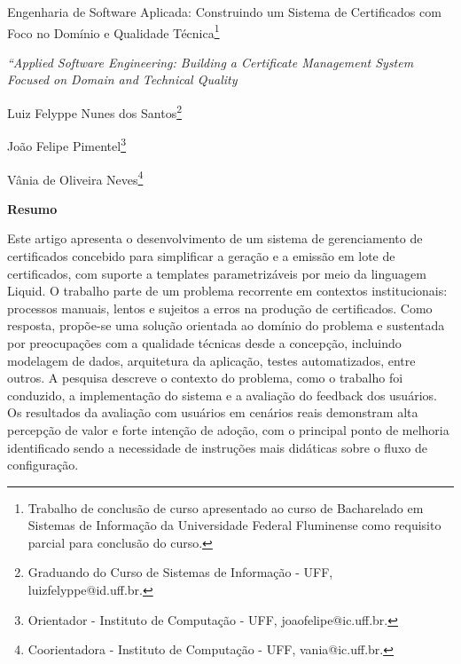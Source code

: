 \documentclass[article,a4paper,12pt,brazil,sumario=tradicional]{abntex2}
\begin{document}
\textual

\begin{center}
{\Large Engenharia de Software Aplicada: Construindo um Sistema de Certificados com Foco no Domínio e Qualidade Técnica\footnote{Trabalho de conclusão de curso apresentado ao curso de Bacharelado em Sistemas de Informação da Universidade Federal Fluminense como requisito parcial para conclusão do curso.}

\vspace{.2cm} 
\textit{“Applied Software Engineering: Building a Certificate Management System Focused on Domain and Technical Quality}\\}
\end{center}
\vspace{.2cm} 

\begin{flushright}
Luiz Felyppe Nunes dos Santos\footnote{Graduando do Curso de Sistemas de Informação - UFF, luizfelyppe@id.uff.br.} 

João Felipe Pimentel\footnote{Orientador - Instituto de Computação - UFF, joaofelipe@ic.uff.br.} 

Vânia de Oliveira Neves\footnote{Coorientadora - Instituto de Computação - UFF, vania@ic.uff.br.}
\end{flushright}

\vspace{\onelineskip}

\begin{center}
    \textbf{Resumo}
\end{center}

\vspace{-.3cm}

\noindent Este artigo apresenta o desenvolvimento de um sistema de gerenciamento de certificados concebido para simplificar a geração e a emissão em lote de certificados, com suporte a templates parametrizáveis por meio da linguagem Liquid. O trabalho parte de um problema recorrente em contextos institucionais: processos manuais, lentos e sujeitos a erros na produção de certificados. Como resposta, propõe-se uma solução orientada ao domínio do problema e sustentada por preocupações com a qualidade técnicas desde a concepção, incluindo modelagem de dados, arquitetura da aplicação, testes automatizados, entre outros. A pesquisa descreve o contexto do problema, como o trabalho foi conduzido, a implementação do sistema e a avaliação do feedback dos usuários. Os resultados da avaliação com usuários em cenários reais demonstram alta percepção de valor e forte intenção de adoção, com o principal ponto de melhoria identificado sendo a necessidade de instruções mais didáticas sobre o fluxo de configuração.
\end{document}
